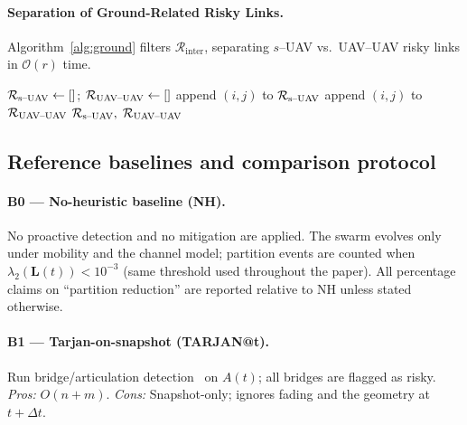 \documentclass[preprint,12pt]{elsarticle}
\theoremstyle{definition}\newtheorem{definition}{Definition}
\theoremstyle{plain}\newtheorem{theorem}{Theorem}
\theoremstyle{plain}\newtheorem{lemma}{Lemma}
\theoremstyle{plain}\newtheorem{corollary}{Corollary}
\theoremstyle{plain}\newtheorem{assumption}{Assumption}
\theoremstyle{remark}\newtheorem{remark}[theorem]{Remark}
\begin{document}
\paragraph{Separation of Ground-Related Risky Links.}
Algorithm~\ref{alg:ground} filters $\mathcal R_{\mathrm{inter}}$, separating $s$–UAV vs.\ UAV–UAV risky links in $\mathcal O(r)$ time.

\newcommand{\sDashUAV}{\text{s\textendash UAV}}
\newcommand{\dashUAV}{\text{UAV\textendash UAV}}

\begin{algorithm}[H]\small
  \caption{\textsc{SeparateGroundLinks} ($\mathcal O(r)$ separation)}
  \label{alg:ground}
  \begin{algorithmic}[1]
    \Ensure{$\mathcal R_{\sDashUAV},\;\mathcal R_{\dashUAV}$}
    \State $\mathcal R_{\sDashUAV}\gets []$; $\mathcal R_{\dashUAV}\gets []$
        \State append $(i,j)$ to $\mathcal R_{\sDashUAV}$
      \Else
        \State append $(i,j)$ to $\mathcal R_{\dashUAV}$
      \EndIf
    \EndFor
    \State \Return $\mathcal R_{\sDashUAV},\;\mathcal R_{\dashUAV}$
  \end{algorithmic}
\end{algorithm}

\subsection{Reference baselines and comparison protocol}
\label{subsec:baselines}

\paragraph{B0 — No-heuristic baseline (NH).} No proactive detection and no mitigation are applied. The swarm evolves only under mobility and the channel model; partition events are counted when $\lambda_2(\boldsymbol L(t)) < 10^{-3}$ (same threshold used throughout the paper). All percentage claims on “partition reduction” are reported relative to NH unless stated otherwise.

\paragraph{B1 — Tarjan-on-snapshot (TARJAN@t).} Run bridge/articulation detection~\cite{tarjan1972dfs} on $A(t)$; all bridges are flagged as risky. \emph{Pros:} $O(n{+}m)$. \emph{Cons:} Snapshot-only; ignores fading and the geometry at $t{+}\Delta t$.
\end{document}
